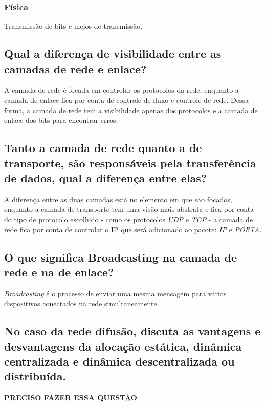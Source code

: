 \subsubsection{Física}

Transmissão de bits e meios de transmissão.

\subsection{Qual a diferença de visibilidade entre as camadas de rede e
enlace?}

A camada de rede é focada em controlar os protocolos
da rede, enquanto a camada de enlace fica por conta 
de controle de fluxo e controle de rede. Dessa forma,
a camada de rede tem a visibilidade apenas dos protocolos
e a camada de enlace dos bits para encontrar erros.

\subsection{Tanto a camada de rede quanto a de transporte, são
responsáveis pela transferência de dados, qual a diferença
entre elas?}

A diferença entre as duas camadas está no elemento em que 
são focados, enquanto a camada de transporte tem uma visão
mais abstrata e fica por conta do tipo de protocolo escolhido
- como os protocolos \emph{UDP} e \emph{TCP} - a camada de rede
fica por conta de controlar o IP que será adicionado ao pacote:
\emph{IP} e \emph{PORTA}.
 
\subsection{O que significa Broadcasting na camada de rede e na de
enlace?}

\emph{Broadcasting} é o processo de enviar uma mesma mensagem
para vários dispositivos conectados na rede simultaneamente.

\subsection{No caso da rede difusão, discuta as vantagens e
desvantagens da alocação estática, dinâmica centralizada e
dinâmica descentralizada ou distribuída.}

\textbf{PRECISO FAZER ESSA QUESTÃO}